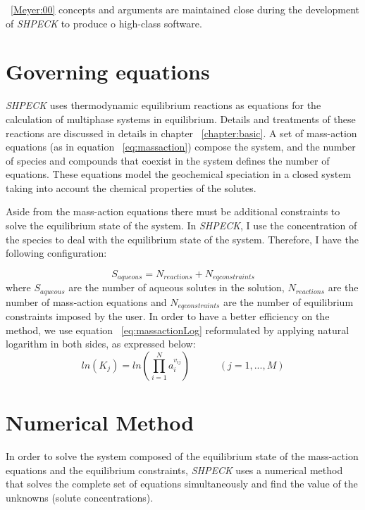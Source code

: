 ~\ref{Meyer:00} concepts and arguments are maintained close during the development of \emph{SHPECK} to produce o high-class software.

\section{Governing equations}

\emph{SHPECK} uses thermodynamic equilibrium reactions as equations for the calculation of multiphase systems in equilibrium. Details and treatments of these reactions are discussed in details in chapter ~\ref{chapter:basic}. A set of mass-action equations (as in equation ~\ref{eq:massaction}) compose the system, and the number of species and compounds that coexist in the system defines the number of equations. These equations model the geochemical speciation in a closed system taking into account the chemical properties of the solutes.

Aside from the mass-action equations there must be additional constraints to solve the equilibrium state of the system. In \emph{SHPECK}, I use the concentration of the species to deal with the equilibrium state of the system. Therefore, I have the following configuration:

\begin{equation}\label{eq:configuration}
S_{aqueous} = N_{reactions} + N_{eq constraints}
\end{equation}
where $S_{aqueous}$ are the number of aqueous solutes in the solution, $N_{reactions}$ are the number of mass-action equations and $N_{eq constraints}$ are the number of equilibrium constraints imposed by the user. 
In order to have a better efficiency on the method, we use equation ~\ref{eq:massactionLog} reformulated by applying natural logarithm in both sides, as expressed below:
\begin{equation}\label{eq:massactionLog}
ln({K_j}) =  ln({\prod\limits_{i=1}^N  a_i^{v_{ij}}}) \hspace{35pt}    (j = 1, ... , M)
\end{equation}

\section{Numerical Method}
In order to solve the system composed of the equilibrium state of the mass-action equations and the equilibrium constraints, \emph{SHPECK} uses a numerical method that solves the complete set of equations simultaneously and find the value of the unknowns (solute concentrations).


